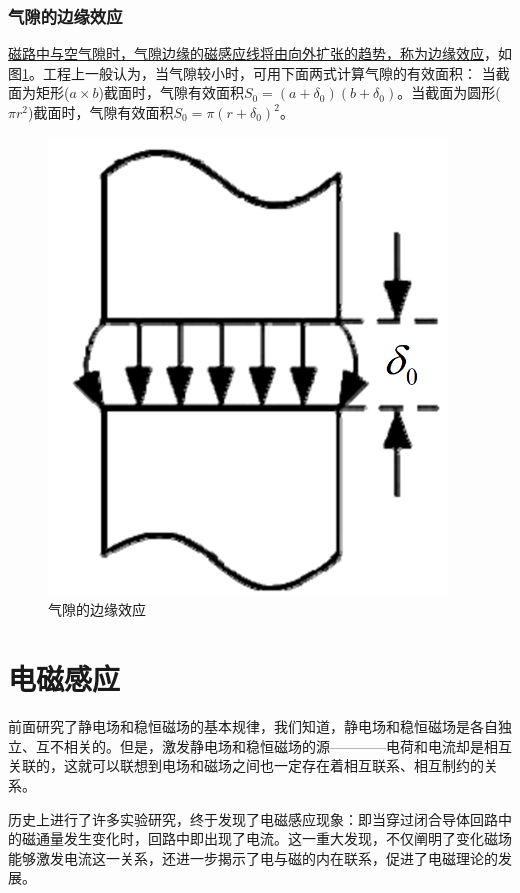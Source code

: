 \documentclass{book}
\begin{document}
\subsubsection{气隙的边缘效应}
\uline{磁路中与空气隙时，气隙边缘的磁感应线将由向外扩张的趋势，称为边缘效应}，如图\ref{fig:qixi bianyuan}。工程上一般认为，当气隙较小时，可用下面两式计算气隙的有效面积：
当截面为矩形($a\times b$)截面时，气隙有效面积$S_0=\left(a+\delta_0\right)\left(b+\delta_0\right)$。当截面为圆形($\pi r^2$)截面时，气隙有效面积$S_0=\pi\left(r+\delta_0\right)^2$。
\begin{figure}[H]
	\centering
	\includegraphics[width=25pc]{qixibianyuan}
	\caption{气隙的边缘效应}
	\label{fig:qixi bianyuan}
\end{figure}

\section{电磁感应}
前面研究了静电场和稳恒磁场的基本规律，我们知道，静电场和稳恒磁场是各自独立、互不相关的。但是，激发静电场和稳恒磁场的源————电荷和电流却是相互关联的，这就可以联想到电场和磁场之间也一定存在着相互联系、相互制约的关系。
\par 历史上进行了许多实验研究，终于发现了电磁感应现象：即当穿过闭合导体回路中的磁通量发生变化时，回路中即出现了电流。这一重大发现，不仅阐明了变化磁场能够激发电流这一关系，还进一步揭示了电与磁的内在联系，促进了电磁理论的发展。
\end{document}
